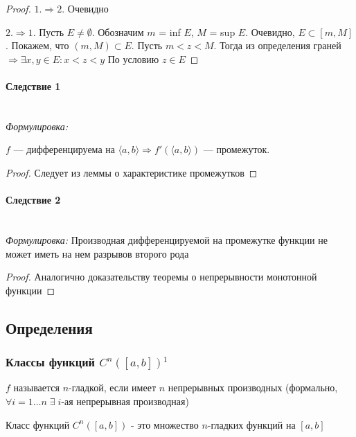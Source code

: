 \documentclass{article}
\let\vanillaparagraph\paragraph
\renewcommand{\paragraph}[1]{\vanillaparagraph{#1}\mbox{}\\}
\begin{document}
    \begin{proof}
    \item{$1. \Rightarrow 2.$} 
    Очевидно
    \item{$2. \Rightarrow 1.$}
    Пусть $E \neq \emptyset$. Обозначим $m$ = inf $E$, $M$ = sup $E$. Очевидно, $E \subset [m, M]$. Покажем, что $(m, M) \subset E$. Пусть $m < z < M$. Тогда из определения граней $\Rightarrow \exists x, y \in E: x < z < y$ По условию $z \in E$
    \end{proof}

    \paragraph{Следствие 1}

    \textit{Формулировка: }

    $f$ --- дифференцируема на $\langle a, b\rangle \Rightarrow f'(\langle a, b\rangle)$ --- промежуток.

    \begin{proof}
    Следует из леммы о характеристике промежутков
    \end{proof}

    \paragraph{Следствие 2}

    \textit{Формулировка: }
    Производная дифференцируемой на промежутке функции не может иметь на нем разрывов второго рода

    \begin{proof}
    Аналогично доказательству теоремы о непрерывности монотонной функции
    \end{proof}

\newpage
\subsection{Определения}

\subsubsection{Классы функций \texorpdfstring{$C^n([a,b])$}{n-гладкое C([a, b])}\texorpdfstring{$^1$}{}}
$f$ называется $n$-гладкой, если имеет $n$ непрерывных производных (формально, $\forall i = 1\ldots n \; \exists \; i$-ая непрерывная производная)

Класс функций $C^n([a,b])$ - это множество $n$-гладких функций на $[a,b]$
\end{document}
